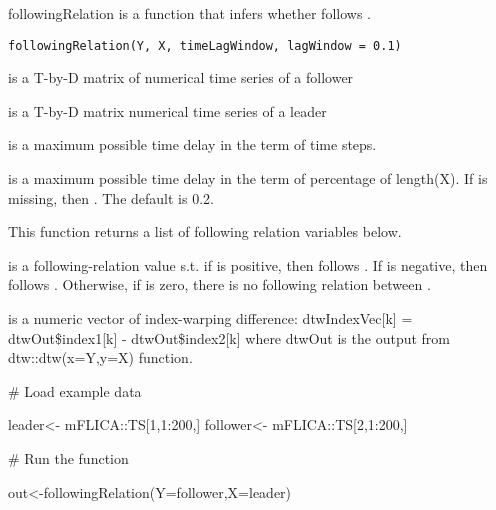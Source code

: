 \documentclass[a4paper]{book}
\begin{document}
%
\begin{Description}\relax
followingRelation is a function that infers whether  follows .
\end{Description}
%
\begin{Usage}
\begin{verbatim}
followingRelation(Y, X, timeLagWindow, lagWindow = 0.1)
\end{verbatim}
\end{Usage}
%
\begin{Arguments}
\begin{ldescription}
\item[\code{Y}] is a T-by-D matrix of numerical time series of a follower

\item[\code{X}] is a T-by-D matrix numerical time series of a leader

\item[\code{timeLagWindow}] is a maximum possible time delay in the term of time steps.

\item[\code{lagWindow}] is a maximum possible time delay in the term of percentage of length(X).
If  is missing, then . The default is 0.2.
\end{ldescription}
\end{Arguments}
%
\begin{Value}
This function returns a list of following relation variables below.

\begin{ldescription}
\item[\code{follVal}]  is a following-relation value s.t. if  is positive, then  follows . If   is negative, then  follows .
Otherwise, if  is zero, there is no following relation between . 
\item[\code{dtwIndexVec}]  is a numeric vector of index-warping difference: dtwIndexVec[k] = dtwOut\$index1[k] - dtwOut\$index2[k] where dtwOut is the output from dtw::dtw(x=Y,y=X) function.
\end{ldescription}
\end{Value}
%
\begin{Examples}
\begin{ExampleCode}
# Load example data

leader<- mFLICA::TS[1,1:200,]
follower<- mFLICA::TS[2,1:200,]

# Run the function

out<-followingRelation(Y=follower,X=leader)

\end{ExampleCode}
\end{Examples}
\end{document}
